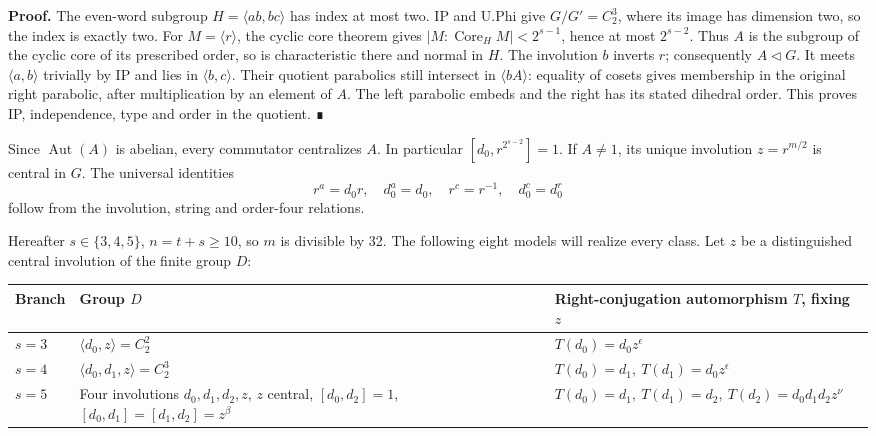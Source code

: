 \documentclass[
  11pt,
  a4paper,
]{article}
\newcounter{none} %
\begin{document}
\textbf{Proof.} The even-word subgroup \(H=\langle ab,bc\rangle\) has
index at most two. IP and U.Phi give \(G/G'=C_2^3\), where its image has
dimension two, so the index is exactly two. For \(M=\langle r\rangle\),
the cyclic core theorem gives \(|M:\operatorname{Core}_H M|<2^{s-1}\),
hence at most \(2^{s-2}\). Thus \(A\) is the subgroup of the cyclic core
of its prescribed order, so is characteristic there and normal in \(H\).
The involution \(b\) inverts \(r\); consequently \(A\lhd G\). It meets
\(\langle a,b\rangle\) trivially by IP and lies in
\(\langle b,c\rangle\). Their quotient parabolics still intersect in
\(\langle bA\rangle\): equality of cosets gives membership in the
original right parabolic, after multiplication by an element of \(A\).
The left parabolic embeds and the right has its stated dihedral order.
This proves IP, independence, type and order in the quotient. ∎

Since \(\operatorname{Aut}(A)\) is abelian, every commutator centralizes
\(A\). In particular \([d_0,r^{2^{s-2}}]=1\). If \(A\ne1\), its unique
involution \(z=r^{m/2}\) is central in \(G\). The universal identities
\[
 r^a=d_0r,\quad d_0^a=d_0,\quad r^c=r^{-1},\quad d_0^c=d_0^r       \tag{A-C1}
\] follow from the involution, string and order-four relations.

Hereafter \(s\in\{3,4,5\}\), \(n=t+s\ge10\), so \(m\) is divisible by
32. The following eight models will realize every class. Let \(z\) be a
distinguished central involution of the finite group \(D\):

{\def\LTcaptype{none} %
\begin{longtable}[]{@{}
  >{\raggedright\arraybackslash}p{}
  >{\raggedright\arraybackslash}p{}
  >{\raggedright\arraybackslash}p{}@{}}
\toprule\noalign{}
\begin{minipage}[b]{\linewidth}\raggedright
Branch
\end{minipage} & \begin{minipage}[b]{\linewidth}\raggedright
Group \(D\)
\end{minipage} & \begin{minipage}[b]{\linewidth}\raggedright
Right-conjugation automorphism \(T\), fixing \(z\)
\end{minipage} \\
\midrule\noalign{}
\endhead
\bottomrule\noalign{}
\endlastfoot
\(s=3\) & \(\langle d_0,z\rangle=C_2^2\) & \(T(d_0)=d_0z^\epsilon\) \\
\(s=4\) & \(\langle d_0,d_1,z\rangle=C_2^3\) &
\(T(d_0)=d_1,\ T(d_1)=d_0z^\epsilon\) \\
\(s=5\) & Four involutions \(d_0,d_1,d_2,z\), \(z\) central,
\([d_0,d_2]=1\), \([d_0,d_1]=[d_1,d_2]=z^\beta\) &
\(T(d_0)=d_1,\ T(d_1)=d_2,\ T(d_2)=d_0d_1d_2z^\nu\) \\
\end{longtable}
}
\end{document}
